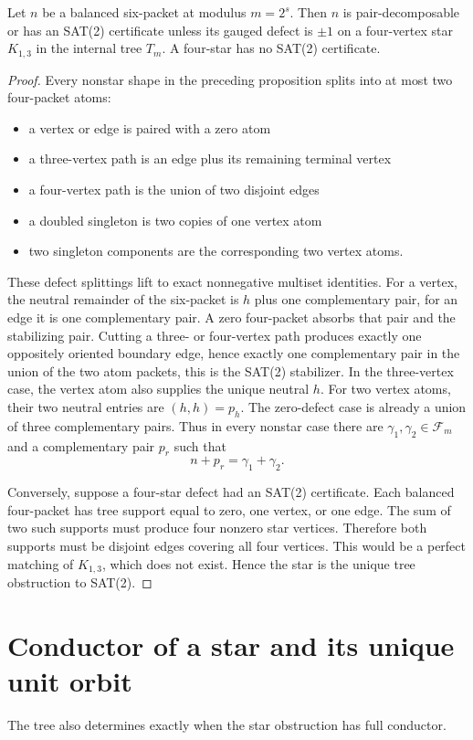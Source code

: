 \begin{manuscriptclaim}
Let \(n\) be a balanced six-packet at modulus \(m=2^s\). Then \(n\) is pair-decomposable or has an SAT(2) certificate unless its gauged defect is \(\pm1\) on a four-vertex star \(K_{1,3}\) in the internal tree \(T_m\). A four-star has no SAT(2) certificate.
\end{manuscriptclaim}
\begin{proof}
Every nonstar shape in the preceding proposition splits into at most two four-packet atoms:
\begin{itemize}
\item a vertex or edge is paired with a zero atom
\item a three-vertex path is an edge plus its remaining terminal vertex
\item a four-vertex path is the union of two disjoint edges
\item a doubled singleton is two copies of one vertex atom
\item two singleton components are the corresponding two vertex atoms.
\end{itemize}
These defect splittings lift to exact nonnegative multiset identities. For a vertex, the neutral remainder of the six-packet is \(h\) plus one complementary pair, for an edge it is one complementary pair. A zero four-packet absorbs that pair and the stabilizing pair. Cutting a three- or four-vertex path produces exactly one oppositely oriented boundary edge, hence exactly one complementary pair in the union of the two atom packets, this is the SAT(2) stabilizer. In the three-vertex case, the vertex atom also supplies the unique neutral \(h\). For two vertex atoms, their two neutral entries are \((h,h)=p_h\). The zero-defect case is already a union of three complementary pairs. Thus in every nonstar case there are \(\gamma_1,\gamma_2\in\mathcal F_m\) and a complementary pair \(p_r\) such that
\[
n+p_r=\gamma_1+\gamma_2.
\]

Conversely, suppose a four-star defect had an SAT(2) certificate. Each balanced four-packet has tree support equal to zero, one vertex, or one edge. The sum of two such supports must produce four nonzero star vertices. Therefore both supports must be disjoint edges covering all four vertices. This would be a perfect matching of \(K_{1,3}\), which does not exist. Hence the star is the unique tree obstruction to SAT(2).
\end{proof}

\section{Conductor of a star and its unique unit orbit}
The tree also determines exactly when the star obstruction has full conductor.

